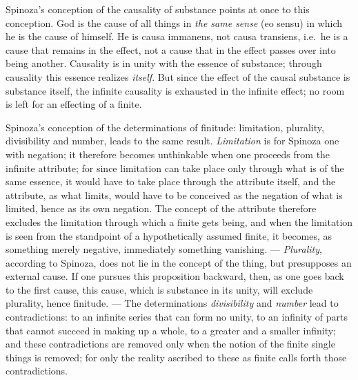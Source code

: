 Spinoza's conception of the causality of substance points at once to
this conception. God is the cause of all things in \emph{the same sense}
(eo sensu) in which he is the cause of himself. He is causa immanens,
not causa transiens, i.e.\ he is a cause that remains in the effect, not
a cause that in the effect passes over into being another. Causality is
in unity with the essence of substance; through causality this essence
realizes \emph{itself}. But since the effect of the causal substance is
substance itself, the infinite causality is exhausted in the infinite
effect; no room is left for an effecting of a finite.

Spinoza's conception of the determinations of finitude: limitation,
plurality, divisibility and number, leads to the same result.
\emph{Limitation} is for Spinoza one with negation; it therefore becomes
unthinkable when one proceeds from the infinite attribute; for since
limitation can take place only through what is of the same essence,
it would have to take place through the attribute itself, and the
attribute, as what limits, would have to be conceived as the negation of
what is limited, hence as its own negation. The concept of the attribute
therefore excludes the limitation through which a finite gets being,
and when the limitation is seen from the standpoint of a hypothetically
assumed finite, it becomes, as something merely negative, immediately
something vanishing. --- \emph{Plurality}, according to Spinoza, does not
lie in the concept of the thing, but presupposes an external cause. If
one pursues this proposition backward, then, as one goes back to the
first cause, this cause, which is substance in its unity, will exclude
plurality, hence finitude. --- The determinations \emph{divisibility}
and \emph{number} lead to contradictions: to an infinite series
that can form no unity, to an infinity of parts that cannot
succeed in making up a whole, to a greater and a smaller infinity; and
these contradictions are removed only when the notion of the finite
single things is removed; for only the reality ascribed to these as
finite calls forth those contradictions.

